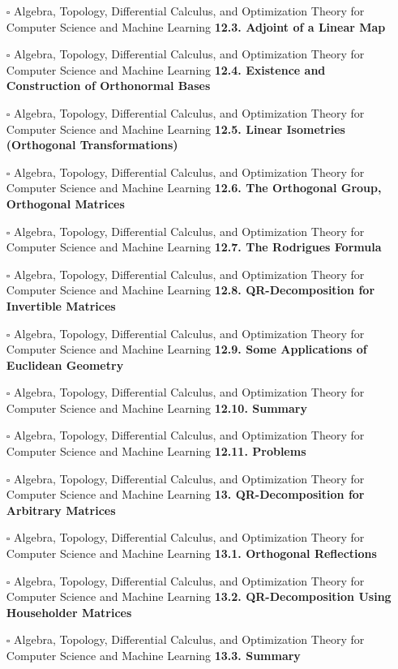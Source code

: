 \documentclass[a4, landscape, 12pt]{article}
\newcommand{\checkbox}{$\square$}%
\begin{document}
\begin{itemize}
{}
\item [\checkbox]  Algebra, Topology, Differential Calculus, and Optimization Theory for Computer Science and Machine Learning \textbf{ 12.3. Adjoint of a Linear Map
}
\item [\checkbox]  Algebra, Topology, Differential Calculus, and Optimization Theory for Computer Science and Machine Learning \textbf{ 12.4. Existence and Construction of Orthonormal Bases
}
\item [\checkbox]  Algebra, Topology, Differential Calculus, and Optimization Theory for Computer Science and Machine Learning \textbf{ 12.5. Linear Isometries (Orthogonal Transformations)
}
\item [\checkbox]  Algebra, Topology, Differential Calculus, and Optimization Theory for Computer Science and Machine Learning \textbf{ 12.6. The Orthogonal Group, Orthogonal Matrices
}
\item [\checkbox]  Algebra, Topology, Differential Calculus, and Optimization Theory for Computer Science and Machine Learning \textbf{ 12.7. The Rodrigues Formula
}
\item [\checkbox]  Algebra, Topology, Differential Calculus, and Optimization Theory for Computer Science and Machine Learning \textbf{ 12.8. QR-Decomposition for Invertible Matrices
}
\item [\checkbox]  Algebra, Topology, Differential Calculus, and Optimization Theory for Computer Science and Machine Learning \textbf{ 12.9. Some Applications of Euclidean Geometry
}
\item [\checkbox]  Algebra, Topology, Differential Calculus, and Optimization Theory for Computer Science and Machine Learning \textbf{ 12.10. Summary
}
\item [\checkbox]  Algebra, Topology, Differential Calculus, and Optimization Theory for Computer Science and Machine Learning \textbf{ 12.11. Problems
}
\item [\checkbox]  Algebra, Topology, Differential Calculus, and Optimization Theory for Computer Science and Machine Learning \textbf{ 13. QR-Decomposition for Arbitrary Matrices
}
\item [\checkbox]  Algebra, Topology, Differential Calculus, and Optimization Theory for Computer Science and Machine Learning \textbf{ 13.1. Orthogonal Reflections
}
\item [\checkbox]  Algebra, Topology, Differential Calculus, and Optimization Theory for Computer Science and Machine Learning \textbf{ 13.2. QR-Decomposition Using Householder Matrices
}
\item [\checkbox]  Algebra, Topology, Differential Calculus, and Optimization Theory for Computer Science and Machine Learning \textbf{ 13.3. Summary
}
\end{itemize}
\end{document}
